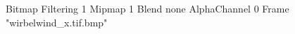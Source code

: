 {Bitmap
	{Filtering 1}
	{Mipmap 1}
	{Blend none}
	{AlphaChannel 0}
	{Frame "wirbelwind_x.tif.bmp"}
}
